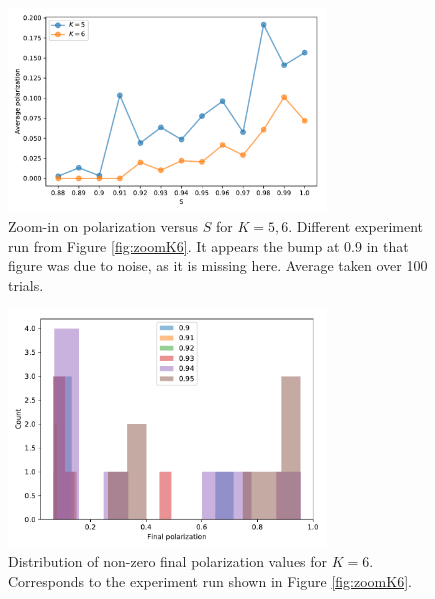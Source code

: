 \documentclass[11pt,letterpaper]{article}
\begin{document}
\begin{figure}[t!]
  \centering
    \includegraphics[width=0.75\textwidth]{Figures/p_v_s_k56detail.pdf}
  \caption{Zoom-in on polarization versus $S$ for $K=5,6$. Different 
    experiment run from Figure \ref{fig:zoomK6}. It appears the bump at
    0.9 in that figure was due to noise, as it is missing here.
    Average taken over 100 trials.
  }
  \label{fig:zoomK56}
\end{figure}

\begin{figure}[t!]
  \centering
    \includegraphics[width=0.75\textwidth]{Figures/p_v_s_k6_histograms.pdf}
  \caption{Distribution of non-zero final polarization values for $K=6$.
    Corresponds to the experiment run shown in Figure \ref{fig:zoomK6}.
  }
  \label{fig:K6-histograms}
\end{figure}
\end{document}
